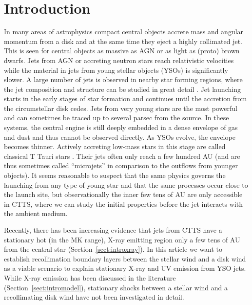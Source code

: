 \documentclass{emulateapj}
\begin{document}



\section{Introduction} 
In many areas of astrophysics compact central objects accrete mass and angular momentum from a disk and at the same time they eject a highly collimated jet. This is seen for central objects as massive as AGN or as light as (proto) brown dwarfs. Jets from AGN or accreting neutron stars reach relativistic velocities while the material in jets from young stellar objects (YSOs) is significantly slower. 
A large number of jets is observed in nearby star forming regions, where the jet composition and structure can be studied in great detail \citep[see the review by][]{2014arXiv1402.3553F}.
Jet launching starts in the early stages of star formation and continues until the accretion from the circumstellar disk cedes. Jets from very young stars are the most powerful and can sometimes be traced up to several parsec from the source. In these systems, the central engine is still deeply embedded in a dense envelope of gas and dust and thus cannot be observed directly. As YSOs evolve, the envelope becomes thinner. Actively accreting low-mass stars in this stage are called classical T Tauri stars \citep[for a review see][]{2013AN....334...67G}. Their jets often only reach a few hundred AU (and are thus sometimes called ``microjets'' in comparison to the outflows from younger objects).
It seems reasonable to suspect that the same physics governs the launching from any type of young star and that the same processes occur close to the launch site, but observationally the inner few tens of AU are only accessible in CTTS, where we can study the initial properties before the jet interacts with the ambient medium. 

Recently, there has been increasing evidence that jets from CTTS have a stationary hot (in the MK range), X-ray emitting region only a few tens of AU from the central star (Section~\ref{sect:introxray}). In this article we want to establish recollimation boundary layers between the stellar wind and a disk wind as a viable scenario to explain stationary X-ray and UV emission from YSO jets.
While X-ray emission has been discussed in the literature (Section~\ref{sect:intromodel}), stationary shocks between a stellar wind and a recollimating disk wind have not been investigated in detail. 
\end{document}
